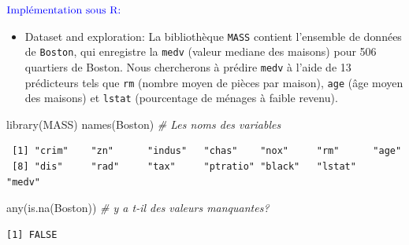 \documentclass[
  8pt,
  ignorenonframetext,
]{beamer}
\newenvironment{Shaded}{\begin{snugshade}}{\end{snugshade}}
\newcommand{\CommentTok}[1]{\textcolor[rgb]{0.56,0.35,0.01}{\textit{#1}}}
\newcommand{\FunctionTok}[1]{\textcolor[rgb]{0.00,0.00,0.00}{#1}}
\newcommand{\NormalTok}[1]{#1}
\providecommand{\tightlist}{%
  \setlength{\itemsep}{0pt}\setlength{\parskip}{0pt}}
\begin{document}
\begin{frame}[fragile]
\(\bf\color{blue}{\text{Implémentation sous R:}}\)

\begin{itemize}
\tightlist
\item
  Dataset and exploration: La bibliothèque \texttt{MASS} contient
  l'ensemble de données de \texttt{Boston}, qui enregistre la
  \texttt{medv} (valeur mediane des maisons) pour 506 quartiers de
  Boston. Nous chercherons à prédire \texttt{medv} à l'aide de 13
  prédicteurs tels que \texttt{rm} (nombre moyen de pièces par maison),
  \texttt{age} (âge moyen des maisons) et \texttt{lstat} (pourcentage de
  ménages à faible revenu).
\end{itemize}

\footnotesize

\begin{Shaded}
\begin{Highlighting}[]
\FunctionTok{library}\NormalTok{(MASS)  }
\FunctionTok{names}\NormalTok{(Boston)      }\CommentTok{\# Les noms des variables}
\end{Highlighting}
\end{Shaded}

\begin{verbatim}
 [1] "crim"    "zn"      "indus"   "chas"    "nox"     "rm"      "age"    
 [8] "dis"     "rad"     "tax"     "ptratio" "black"   "lstat"   "medv"   
\end{verbatim}

\begin{Shaded}
\begin{Highlighting}[]
\FunctionTok{any}\NormalTok{(}\FunctionTok{is.na}\NormalTok{(Boston)) }\CommentTok{\# y a t{-}il des valeurs manquantes?}
\end{Highlighting}
\end{Shaded}

\begin{verbatim}
[1] FALSE
\end{verbatim}

\normalsize
\end{frame}
\end{document}
